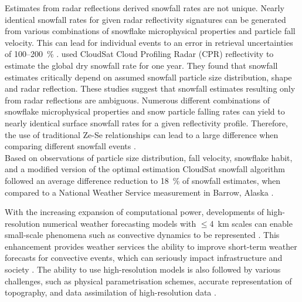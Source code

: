 \par\medskip
\noindent
Estimates from radar reflections derived snowfall rates are not unique. Nearly identical snowfall rates for given radar reflectivity signatures can be generated from various combinations of snowflake microphysical properties and particle fall velocity. This can lead for individual events to an error in retrieval uncertainties of \num{100}--\SI{200}{\percent} \citep{wood_estimation_2011}. \citet{kulie_utilizing_2009} used CloudSat Cloud Profiling Radar (CPR) reflectivity to estimate the global dry snowfall rate for one year. They found that snowfall estimates critically depend on assumed snowfall particle size distribution, shape and radar reflection. These studies suggest that snowfall estimates resulting only from radar reflections are ambiguous. Numerous different combinations of snowflake microphysical properties and snow particle falling rates can yield to nearly identical surface snowfall rates for a given reflectivity profile. Therefore, the use of traditional Ze-Se relationships can lead to a large difference when comparing different snowfall events \citep{cooper_variational_2017}.
\\
Based on observations of particle size distribution, fall velocity, snowflake habit, and a modified version of the optimal estimation CloudSat snowfall algorithm followed an average difference reduction to \SI{18}{\percent} of snowfall estimates, when compared to a National Weather Service measurement in Barrow, Alaska \citep{cooper_variational_2017}.
\par\medskip
\noindent
With the increasing expansion of computational power, developments of high-resolution numerical weather forecasting models with $\le$\SI{4}{\km} scales can enable small-scale phenomena such as convective dynamics to be represented \citep{gowan_validation_2018}. This enhancement provides weather services the ability to improve short-term weather forecasts for convective events, which can seriously impact infrastructure and society \citep{muller_arome-metcoop:_2017}. The ability to use high-resolution models is also followed by various challenges, such as physical parametrisation schemes, accurate representation of topography, and data assimilation of high-resolution data \citep{sun_convective-scale_2005}.
\\
